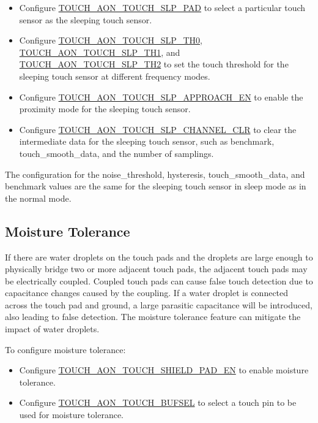 \documentclass[main\_\_EN.tex]{subfiles}
\begin{document}
\begin{itemize}
    \item Configure \hyperref[fielddesc:TOUCHAONTOUCHSLPPAD]{TOUCH\_AON\_TOUCH\_SLP\_PAD} to select a particular touch sensor as the sleeping touch sensor.
    \item Configure \hyperref[fielddesc:TOUCHAONTOUCHSLPTH0]{TOUCH\_AON\_TOUCH\_SLP\_TH0}, \hyperref[fielddesc:TOUCHAONTOUCHSLPTH0]{TOUCH\_AON\_TOUCH\_SLP\_TH1}, and \hyperref[fielddesc:TOUCHAONTOUCHSLPTH0]{TOUCH\_AON\_TOUCH\_SLP\_TH2} to set the touch threshold for the sleeping touch sensor at different frequency modes.
    \item Configure \hyperref[fielddesc:TOUCHAONTOUCHSLPAPPROACHEN]{TOUCH\_AON\_TOUCH\_SLP\_APPROACH\_EN} to enable the proximity mode for the sleeping touch sensor.
    \item Configure \hyperref[fielddesc:TOUCHAONTOUCHSLPCHANNELCLR]{TOUCH\_AON\_TOUCH\_SLP\_CHANNEL\_CLR} to clear the intermediate data for the sleeping touch sensor, such as benchmark, touch\_smooth\_data, and the number of samplings.
\end{itemize}

\begin{tiplisting}
The configuration for the noise\_threshold, hysteresis, touch\_smooth\_data, and benchmark values are the same for the sleeping touch sensor in sleep mode as in the normal mode.
\end{tiplisting}

\subsection{Moisture Tolerance}

If there are water droplets on the touch pads and the droplets are large enough to physically bridge two or more adjacent touch pads, the adjacent touch pads may be electrically coupled. Coupled touch pads can cause false touch detection due to capacitance changes caused by the coupling. If a water droplet is connected across the touch pad and ground, a large parasitic capacitance will be introduced, also leading to false detection. The moisture tolerance feature can mitigate the impact of water droplets.

To configure moisture tolerance:

\begin{itemize}
    \item Configure \hyperref[fielddesc:TOUCHAONTOUCHSHIELDPADEN]{TOUCH\_AON\_TOUCH\_SHIELD\_PAD\_EN} to enable moisture tolerance.
    \item Configure \hyperref[fielddesc:TOUCHAONTOUCHBUFSEL]{TOUCH\_AON\_TOUCH\_BUFSEL} to select a touch pin to be used for moisture tolerance.
\end{itemize}
\end{document}

